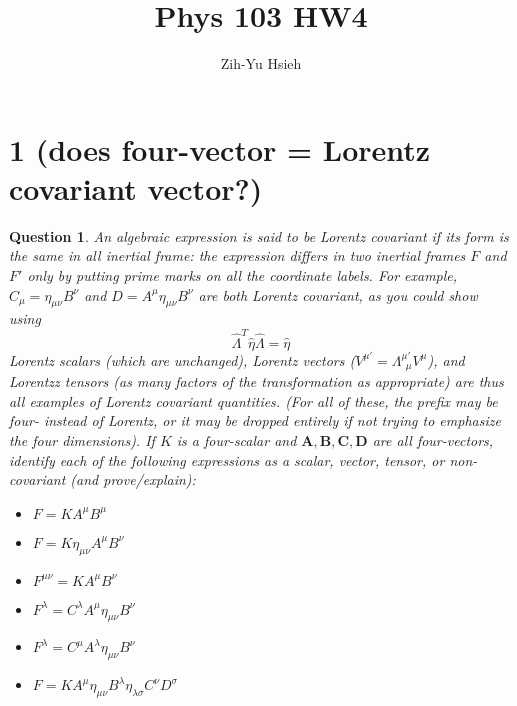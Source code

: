 \documentclass{article}
\title{Phys 103 HW4}
\author{Zih-Yu Hsieh}
\newtheorem{question}{Question}
\begin{document}
\maketitle

\section*{1 (does four-vector = Lorentz covariant vector?)}
\begin{question}\label{q1}
    An algebraic expression is said to be \emph{Lorentz covariant} if its form is the same in all inertial frame: the expression differs in two inertial frames $F$ and $F'$ only by putting prime marks on all the coordinate labels. For example, $C_\mu = \eta_{\mu\nu}B^\nu$ and $D=A^\mu \eta_{\mu\nu}B^{\nu}$ are both Lorentz covariant, as you could show using 
    $$\hat{\Lambda}^T\hat{\eta}\hat{\Lambda}=\hat{\eta}$$
    Lorentz scalars (which are unchanged), Lorentz vectors ($V^{\mu'} = \Lambda^{\mu'}_{\ \ \mu}V^\mu$), and Lorentzz tensors (as many factors of the transformation as appropriate) are thus all examples of Lorentz covariant quantities. (For all of these, the prefix may be \emph{four-} instead of Lorentz, or it may be dropped entirely if not trying to emphasize the four dimensions). If $K$ is a four-scalar and $\textbf{A},\textbf{B},\textbf{C},\textbf{D}$ are all four-vectors, identify each of the following expressions as a scalar, vector, tensor, or non-covariant (and prove/explain):
    \begin{itemize}
        \item $F=KA^\mu B^\mu$
        \item $F=K \eta_{\mu\nu}A^\mu B^\nu$
        \item $F^{\mu\nu} = KA^\mu B^\nu$
        \item $F^\lambda = C^\lambda A^\mu \eta_{\mu\nu}B^\nu$
        \item $F^\lambda = C^\mu A^\lambda \eta_{\mu\nu}B^\nu$
        \item $F=KA^\mu \eta_{\mu\nu}B^\lambda \eta_{\lambda\sigma}C^\nu D^\sigma$
    \end{itemize}
\end{question}
\end{document}
